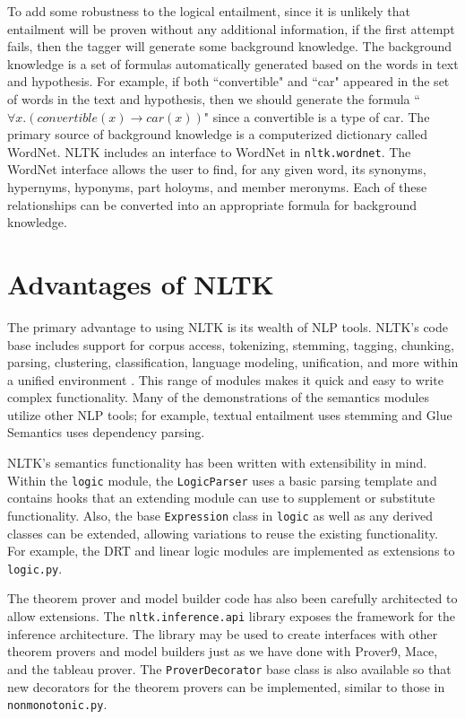 \documentclass[11pt]{article}
\newcommand{\dhgcode}[1]{{\tt #1}}
\begin{document}
To add some robustness to the logical entailment, since it is unlikely that entailment will be proven without any additional information, if the first attempt fails, then the tagger will generate some background knowledge.  The background knowledge is a set of formulas automatically generated based on the words in text and hypothesis.  For example, if both ``convertible" and ``car" appeared in the set of words in the text and hypothesis, then we should generate the formula ``$\forall x.(convertible(x) \rightarrow car(x))$" since a convertible is a type of car.  The primary source of background knowledge is a computerized dictionary called WordNet.  NLTK includes an interface to WordNet in \dhgcode{nltk.wordnet}.  The WordNet interface allows the user to find, for any given word, its synonyms, hypernyms, hyponyms, part holoyms, and member meronyms.  Each of these relationships can be converted into an appropriate formula for background knowledge.


\section{Advantages of NLTK}
The primary advantage to using NLTK is its wealth of NLP tools.  NLTK's code base includes support for corpus access, tokenizing, stemming, tagging, chunking, parsing, clustering, classification, language modeling, unification, and more within a unified environment \cite{Multidisciplinary}.  This range of modules makes it quick and easy to write complex functionality.  Many of the demonstrations of the semantics modules utilize other NLP tools; for example, textual entailment uses stemming and Glue Semantics uses dependency parsing.

NLTK's semantics functionality has been written with extensibility in mind.  Within the \dhgcode{logic} module, the \dhgcode{LogicParser} uses a basic parsing template and contains hooks that an extending module can use to supplement or substitute functionality.  Also, the base \dhgcode{Expression} class in \dhgcode{logic} as well as any derived classes can be extended, allowing variations to reuse the existing functionality.  For example, the DRT and linear logic modules are implemented as extensions to \dhgcode{logic.py}.  

The theorem prover and model builder code has also been carefully architected to allow extensions.  The \dhgcode{nltk.inference.api} library exposes the framework for the inference architecture.  The library may be used to create interfaces with other theorem provers and model builders just as we have done with Prover9, Mace, and the tableau prover.  The \dhgcode{ProverDecorator} base class is also available so that new decorators for the theorem provers can be implemented, similar to those in \dhgcode{nonmonotonic.py}.  
\end{document}

